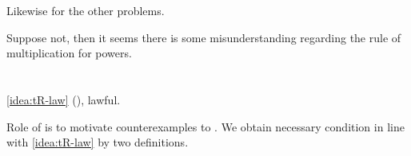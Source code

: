 \begin{note}
\begin{illustration}[Textbook]
    Likewise for the other problems.
  \end{illustration}

  Suppose not, then it seems there is some misunderstanding regarding the rule of multiplication for powers.
\end{note}

\section{}
\label{cha:typical:sec:tR}

\begin{note}
  \autoref{idea:tR-law} (), lawful.

  Role of \tC{} is to motivate counterexamples to \issueConstraint{}.
  We obtain necessary condition in line with \autoref{idea:tR-law} by two definitions.
\end{note}

\subsection{}
\label{cha:typical:sec:tR:ToRdef}

